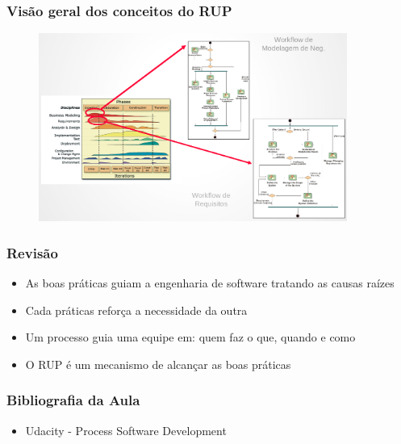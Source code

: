 \begin{frame}
\frametitle{Visão geral dos conceitos do RUP}
\begin{figure}
   \centering
   \includegraphics[width = 0.9\textwidth]{figs/fig24.png}
  \end{figure}
\end{frame}

\begin{frame}
 \frametitle{Revisão}
 \begin{itemize}
  \item As boas práticas guiam a engenharia de software tratando as causas raízes
  \item Cada práticas reforça a necessidade da outra
  \item Um processo guia uma equipe em: quem faz o que, quando e como
  \item O RUP é um mecanismo de alcançar as boas práticas
  \end{itemize}

\end{frame}

\begin{frame}
 \frametitle{Bibliografia da Aula}
 \begin{itemize}
  \item Udacity - Process Software Development
 \end{itemize}

\end{frame}
